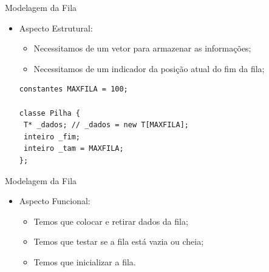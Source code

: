 \documentclass[12pt,table,xcolor={dvipsnames}]{beamer}
\begin{document}
\begin{frame}[fragile]{Modelagem da Fila}

\begin{itemize}
\item Aspecto Estrutural:
\begin{itemize}
\item Necessitamos de um vetor para armazenar as informações;
\item Necessitamos de um indicador da posição atual do fim da fila;
\end{itemize}
\begin{lstlisting}
constantes MAXFILA = 100;

classe Pilha {
 T* _dados; // _dados = new T[MAXFILA];
 inteiro _fim;
 inteiro _tam = MAXFILA;
};
\end{lstlisting}
\end{itemize}
\end{frame}

\begin{frame}[fragile]{Modelagem da Fila}

\begin{itemize}
\item Aspecto Funcional:
\begin{itemize}
\item Temos que colocar e retirar dados da fila;
\item Temos que testar se a fila está vazia ou cheia;
\item Temos que inicializar a fila.
\end{itemize}
\end{itemize}
\end{frame}
\end{document}
